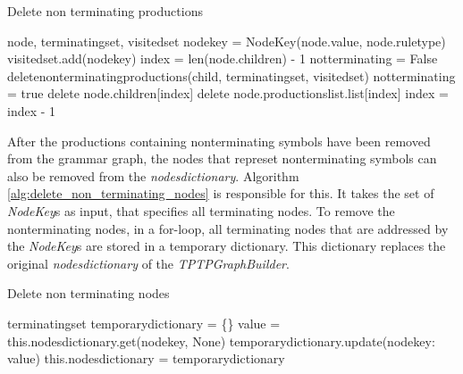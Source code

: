 \begin{algorithm}[H]
\caption{Delete non terminating productions}
\begin{algorithmic}[1] 
\Require node, terminating\textunderscore set, visited\textunderscore set
\State node\textunderscore key = Node\textunderscore Key(node.value, node.rule\textunderscore type)
	\State visited\textunderscore set.add(node\textunderscore key)
	\State index = len(node.children) - 1
		\State not\textunderscore terminating = False
			\State delete\textunderscore non\textunderscore terminating\textunderscore productions(child, terminating\textunderscore set, visited\textunderscore set)
				\State not\textunderscore terminating = true
			\EndIf
		\EndFor
			\State delete node.children[index]
			\State delete node.productions\textunderscore list.list[index]
		\EndIf
		\State index = index - 1
\EndFor
\EndIf
\end{algorithmic}
\label{alg:delete_non_terminating_productions}
\end{algorithm}

After the productions containing nonterminating symbols have been removed from the grammar graph, the nodes that represet nonterminating symbols can also be removed from the \textit{nodes\textunderscore dictionary}.
Algorithm \ref{alg:delete_non_terminating_nodes} is responsible for this. It takes the set of \textit{Node\textunderscore Key}s as input, that specifies all terminating nodes.
To remove the nonterminating nodes, in a for-loop, all terminating nodes that are addressed by the \textit{Node\textunderscore Key}s are stored in a temporary dictionary. This dictionary replaces the original \textit{nodes\textunderscore dictionary} of the \textit{TPTPGraphBuilder}.
\begin{algorithm}[H]
\caption{Delete non terminating nodes}
\begin{algorithmic}[1] 
\Require terminating\textunderscore set
\State temporary\textunderscore dictionary = \{\}
	\State value = this.nodes\textunderscore dictionary.get(node\textunderscore key, None)
	\State temporary\textunderscore dictionary.update({node\textunderscore key: value})
\EndFor
\State this.nodes\textunderscore dictionary = temporary\textunderscore dictionary
\end{algorithmic}
\label{alg:delete_non_terminating_nodes}
\end{algorithm}

